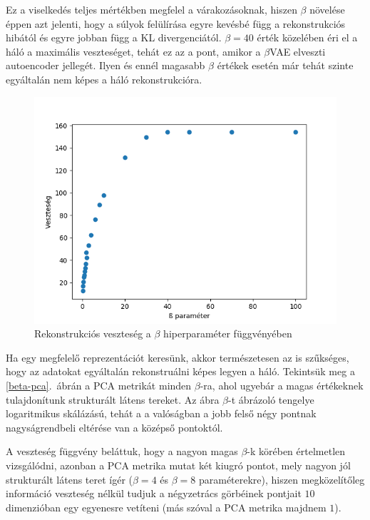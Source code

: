 Ez a viselkedés teljes mértékben megfelel a várakozásoknak, hiszen $\beta$ növelése éppen azt jelenti, hogy a súlyok felülírása egyre kevésbé függ a rekonstrukciós hibától és egyre jobban függ a KL divergenciától. $\beta=40$ érték közelében éri el a háló a maximális veszteséget, tehát ez az a pont, amikor a $\beta$VAE elveszti autoencoder jellegét. Ilyen és ennél magasabb $\beta$ értékek esetén már tehát szinte egyáltalán nem képes a háló rekonstrukcióra.

\begin{figure}[h!]
\begin{center}
  
  \includegraphics[width=0.75\linewidth]{metrics/vae_beta-loss.png}
  \caption{Rekonstrukciós veszteség a $\beta$ hiperparaméter függvényében}\label{beta-loss}
\end{center}
\end{figure}

Ha egy megfelelő reprezentációt keresünk, akkor természetesen az is szűkséges, hogy az adatokat egyáltalán rekonstruálni képes legyen a háló. Tekintsük meg a \ref{beta-pca}.~ábrán a PCA metrikát minden $\beta$-ra, ahol ugyebár a magas értékeknek tulajdonítunk strukturált látens tereket. Az ábra $\beta$-t ábrázoló tengelye logaritmikus skálázású, tehát a a valóságban a jobb felső négy pontnak nagyságrendbeli eltérése van a középső pontoktól.

A veszteség függvény beláttuk, hogy a nagyon magas $\beta$-k körében értelmetlen vizsgálódni, azonban a PCA metrika mutat két kiugró pontot, mely nagyon jól strukturált látens teret ígér ($\beta=4$ és $\beta=8$ paraméterekre), hiszen megközelítőleg információ veszteség nélkül tudjuk a négyzetrács görbéinek pontjait $10$ dimenzióban egy egyenesre vetíteni (más szóval a PCA metrika majdnem $1$).

